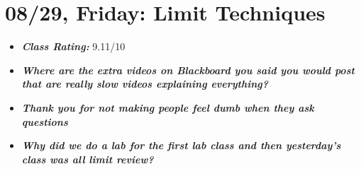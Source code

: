 \documentclass[11pt,letterpaper]{article}
\begin{document}
\newpage
\section*{08/29, Friday: Limit Techniques\label{08-29}}

\begin{itemize}
\item {\bfseries\itshape Class Rating:} 9.11/10
\item {\bfseries\itshape Where are the extra videos on Blackboard you said you would post that are really slow videos explaining everything?} 
\item {\bfseries\itshape Thank you for not making people feel dumb when they ask questions}
\item {\bfseries\itshape Why did we do a lab for the first lab class and then yesterday's class was all limit review?}


\end{itemize}
\end{document}
